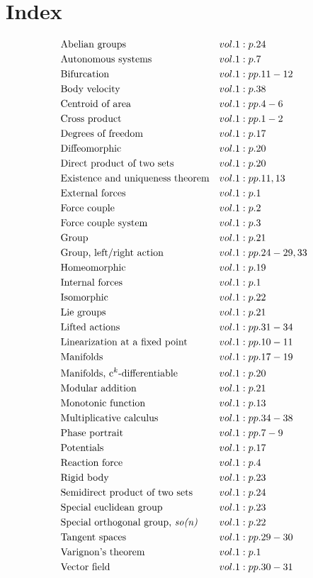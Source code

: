 \documentclass[a4paper]{article}
\begin{document}
 
\section*{Index} 
\begin{align*} 
&\text{Abelian groups}&& vol. 1: p. 24\\
&\text{Autonomous systems}&& vol. 1: p. 7\\
&\text{Bifurcation}&& vol. 1: pp. 11-12\\
&\text{Body velocity}&& vol. 1: p. 38\\
&\text{Centroid of area}&& vol. 1: pp. 4-6\\
&\text{Cross product}&& vol. 1: pp. 1-2\\
&\text{Degrees of freedom}&& vol. 1: p. 17\\
&\text{Diffeomorphic}&& vol. 1: p. 20\\
&\text{Direct product of two sets}&& vol. 1: p. 20\\
&\text{Existence and uniqueness theorem}&& vol. 1: pp. 11, 13\\
&\text{External forces}&& vol. 1: p. 1\\
&\text{Force couple}&& vol. 1: p. 2\\
&\text{Force couple system}&& vol. 1: p. 3\\
&\text{Group}&& vol. 1: p. 21\\
&\text{Group, left/right action}&& vol. 1: pp. 24-29, 33\\
&\text{Homeomorphic}&& vol. 1: p. 19\\
&\text{Internal forces}&& vol. 1: p. 1\\
&\text{Isomorphic}&& vol. 1: p. 22\\
&\text{Lie groups}&& vol. 1: p. 21\\
&\text{Lifted actions}&& vol. 1: pp. 31-34\\
&\text{Linearization at a fixed point}&& vol. 1: pp. 10-11\\
&\text{Manifolds}&& vol. 1: pp. 17-19\\
&\text{Manifolds, c$^k$-differentiable}&& vol. 1: p. 20\\
&\text{Modular addition}&& vol. 1: p. 21\\
&\text{Monotonic function}&& vol. 1: p. 13\\
&\text{Multiplicative calculus}&& vol. 1: pp. 34-38\\
&\text{Phase portrait}&& vol. 1: pp. 7-9\\
&\text{Potentials}&& vol. 1: p. 17\\
&\text{Reaction force}&& vol. 1: p. 4\\
&\text{Rigid body}&& vol. 1: p. 23\\
&\text{Semidirect product of two sets}&& vol. 1: p. 24\\
&\text{Special euclidean group}&& vol. 1: p. 23\\
&\text{Special orthogonal group, \emph{so(n)}}&& vol. 1: p. 22\\
&\text{Tangent spaces}&& vol. 1: pp. 29-30\\
&\text{Varignon's theorem}&& vol. 1: p. 1\\
&\text{Vector field}&& vol. 1: pp. 30-31\\
\end{align*} 
\end{document}
